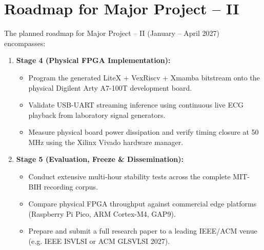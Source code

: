 \documentclass[11pt,a4paper,oneside]{report}
\begin{document}
\section{Roadmap for Major Project -- II}
The planned roadmap for Major Project -- II (January -- April 2027) encompasses:
\begin{enumerate}
    \item \textbf{Stage 4 (Physical FPGA Implementation):}
    \begin{itemize}
        \item Program the generated LiteX + VexRiscv + Xmamba bitstream onto the physical Digilent Arty A7-100T development board.
        \item Validate USB-UART streaming inference using continuous live ECG playback from laboratory signal generators.
        \item Measure physical board power dissipation and verify timing closure at 50 MHz using the Xilinx Vivado hardware manager.
    \end{itemize}
    \item \textbf{Stage 5 (Evaluation, Freeze \& Dissemination):}
    \begin{itemize}
        \item Conduct extensive multi-hour stability tests across the complete MIT-BIH recording corpus.
        \item Compare physical FPGA throughput against commercial edge platforms (Raspberry Pi Pico, ARM Cortex-M4, GAP9).
        \item Prepare and submit a full research paper to a leading IEEE/ACM venue (e.g. IEEE ISVLSI or ACM GLSVLSI 2027).
    \end{itemize}
\end{enumerate}
\end{document}
